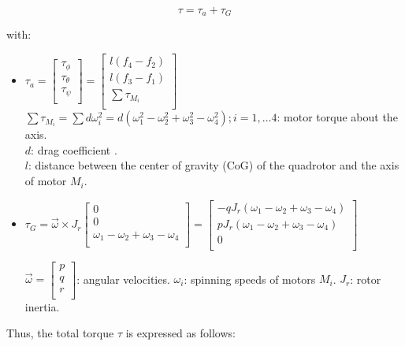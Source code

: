 \documentclass{thesisreport}
\begin{document}
\begin{equation}
	\tau = \tau_a + \tau_G
\end{equation}

with:

\begin{itemize}
	\item $\tau_a = \begin{bmatrix}
\tau_{\phi}\\
\tau_{\theta}\\
\tau_{\psi}\\
\end{bmatrix}= \begin{bmatrix}
l(f_4 - f_2)\\
l(f_3 - f_1)\\
\sum \tau_{M_i}\\
\end{bmatrix}$\\
$\sum \tau_{M_i} = \sum d \omega_i^2=d(\omega_1^2-\omega_2^2+\omega_3^2-\omega_4^2); i=1,\ldots 4$: motor torque about the axis.\\
$d$: drag coefficient .\\
$l$: distance between the center of gravity (CoG) of the quadrotor and the axis of motor $M_i$.

	\item $\tau_G=\overrightarrow{\omega}\times J_r \begin{bmatrix}
0 \\
0 \\
\omega_1 - \omega_2 + \omega_3 - \omega_4 \\
\end{bmatrix} = \begin{bmatrix}
-q J_r (\omega_1 - \omega_2 + \omega_3 - \omega_4)\\
p J_r (\omega_1 - \omega_2 + \omega_3 - \omega_4)\\
0 \\
\end{bmatrix}$

$\overrightarrow{\omega} = \begin{bmatrix}
p \\
q \\
r \\
\end{bmatrix}$: angular velocities.
$\omega_i$: spinning speeds of motors $M_i$.
$J_r$: rotor inertia.
\end{itemize}

Thus, the total torque $\tau$ is expressed as follows:
\end{document}

